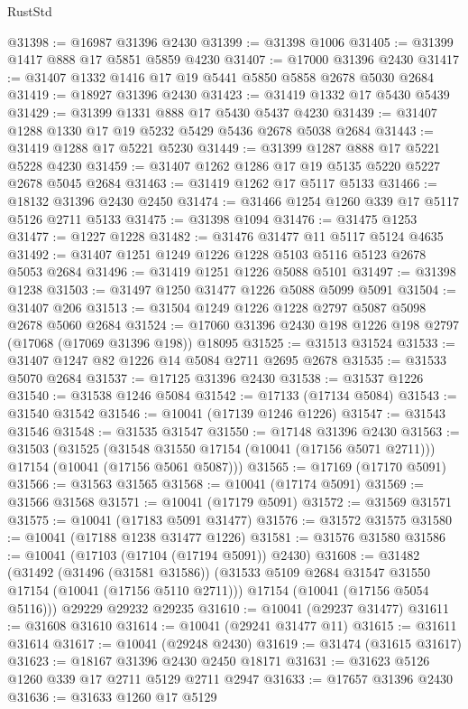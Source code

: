 \begin{lexlean}{RustStd}
\begin{coremodule}
@31398 := @16987 @31396 @2430
@31399 := @31398 @1006
@31405 := @31399 @1417 @888 @17 @5851 @5859 @4230
@31407 := @17000 @31396 @2430
@31417 := @31407 @1332 @1416 @17 @19 @5441 @5850 @5858 @2678 @5030 @2684
@31419 := @18927 @31396 @2430
@31423 := @31419 @1332 @17 @5430 @5439
@31429 := @31399 @1331 @888 @17 @5430 @5437 @4230
@31439 := @31407 @1288 @1330 @17 @19 @5232 @5429 @5436 @2678 @5038 @2684
@31443 := @31419 @1288 @17 @5221 @5230
@31449 := @31399 @1287 @888 @17 @5221 @5228 @4230
@31459 := @31407 @1262 @1286 @17 @19 @5135 @5220 @5227 @2678 @5045 @2684
@31463 := @31419 @1262 @17 @5117 @5133
@31466 := @18132 @31396 @2430 @2450
@31474 := @31466 @1254 @1260 @339 @17 @5117 @5126 @2711 @5133
@31475 := @31398 @1094
@31476 := @31475 @1253
@31477 := @1227 @1228
@31482 := @31476 @31477 @11 @5117 @5124 @4635
@31492 := @31407 @1251 @1249 @1226 @1228 @5103 @5116 @5123 @2678 @5053 @2684
@31496 := @31419 @1251 @1226 @5088 @5101
@31497 := @31398 @1238
@31503 := @31497 @1250 @31477 @1226 @5088 @5099 @5091
@31504 := @31407 @206
@31513 := @31504 @1249 @1226 @1228 @2797 @5087 @5098 @2678 @5060 @2684
@31524 := @17060 @31396 @2430 @198 @1226 @198 @2797 (@17068 (@17069 @31396 @198)) @18095
@31525 := @31513 @31524
@31533 := @31407 @1247 @82 @1226 @14 @5084 @2711 @2695 @2678
@31535 := @31533 @5070 @2684
@31537 := @17125 @31396 @2430
@31538 := @31537 @1226
@31540 := @31538 @1246 @5084
@31542 := @17133 (@17134 @5084)
@31543 := @31540 @31542
@31546 := @10041 (@17139 @1246 @1226)
@31547 := @31543 @31546
@31548 := @31535 @31547
@31550 := @17148 @31396 @2430
@31563 := @31503
    (@31525
      (@31548 @31550 @17154 (@10041 (@17156 @5071 @2711)))
      @17154
      (@10041 (@17156 @5061 @5087)))
@31565 := @17169 (@17170 @5091)
@31566 := @31563 @31565
@31568 := @10041 (@17174 @5091)
@31569 := @31566 @31568
@31571 := @10041 (@17179 @5091)
@31572 := @31569 @31571
@31575 := @10041 (@17183 @5091 @31477)
@31576 := @31572 @31575
@31580 := @10041 (@17188 @1238 @31477 @1226)
@31581 := @31576 @31580
@31586 := @10041 (@17103 (@17104 (@17194 @5091)) @2430)
@31608 := @31482
    (@31492
      (@31496 (@31581 @31586))
      (@31533 @5109 @2684 @31547 @31550 @17154 (@10041 (@17156 @5110 @2711)))
      @17154
      (@10041 (@17156 @5054 @5116)))
    @29229
    @29232
    @29235
@31610 := @10041 (@29237 @31477)
@31611 := @31608 @31610
@31614 := @10041 (@29241 @31477 @11)
@31615 := @31611 @31614
@31617 := @10041 (@29248 @2430)
@31619 := @31474 (@31615 @31617)
@31623 := @18167 @31396 @2430 @2450 @18171
@31631 := @31623 @5126 @1260 @339 @17 @2711 @5129 @2711 @2947
@31633 := @17657 @31396 @2430
@31636 := @31633 @1260 @17 @5129

\end{coremodule}
\end{lexlean}

